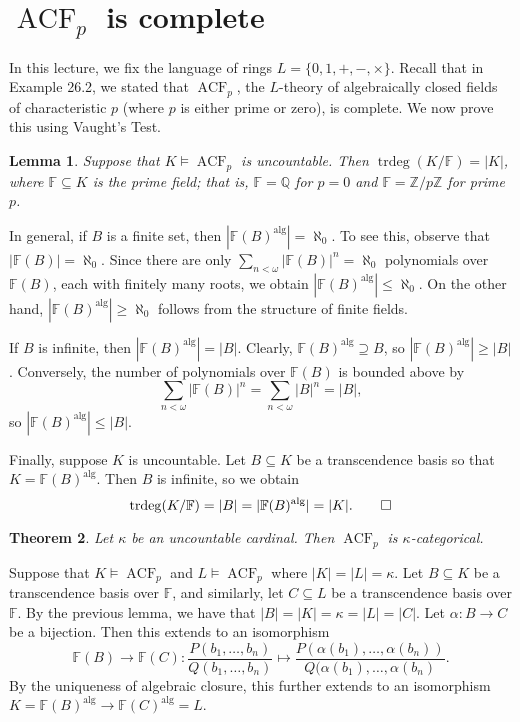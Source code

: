 \documentclass[10pt]{article}
\makeatletter
\newcommand{\Z}{\mathbb{Z}}
\newcommand{\Q}{\mathbb{Q}}
\newcommand{\F}{\mathbb{F}}
\DeclareMathOperator{\ACF}{ACF}
\DeclareMathOperator{\trdeg}{trdeg}
\DeclareMathOperator{\alg}{alg}
\theoremstyle{newstyle}
\newtheorem{thm}{Theorem}[section]
\newtheorem{lemma}[thm]{Lemma}
\newenvironment{pf}[1][\proofname]{\par
  \pushQED{\qed}%
  \normalfont \topsep0\p@\relax
  \trivlist
  \item[\hskip\labelsep\scshape
  #1\@addpunct{.}]\ignorespaces
}{%
  \popQED\endtrivlist\@endpefalse
}
\makeatother
\begin{document}
\newpage
\section{$\ACF_p$ is complete}

In this lecture, we fix the language of rings $L = \{0, 1, +, -, \times\}$. Recall that in Example 26.2, 
we stated that $\ACF_p$, the $L$-theory of algebraically closed fields of characteristic $p$ 
(where $p$ is either prime or zero), is complete. We now prove this using Vaught's Test. 

\begin{lemma}
Suppose that $K \vDash \ACF_p$ is uncountable. Then $\trdeg(K/\F) = |K|$, where $\F \subseteq K$ 
is the prime field; that is, $\F = \Q$ for $p = 0$ and $\F = \Z/p\Z$ for prime $p$. 
\end{lemma}
\begin{pf}
In general, if $B$ is a finite set, then $|\F(B)^{\alg}| = \aleph_0$. To see this, 
observe that $|\F(B)| = \aleph_0$. Since there are only $\sum_{n<\omega} |\F(B)|^n = \aleph_0$ 
polynomials over $\F(B)$, each with finitely many roots, we obtain 
$|\F(B)^{\alg}| \leq \aleph_0$. On the other hand, $|\F(B)^{\alg}| \geq \aleph_0$ follows 
from the structure of finite fields. 

If $B$ is infinite, then $|\F(B)^{\alg}| = |B|$. Clearly, $\F(B)^{\alg} \supseteq B$, so 
$|\F(B)^{\alg}| \geq |B|$. Conversely, the number of polynomials over $\F(B)$ is bounded above by 
\[ \sum_{n<\omega} |\F(B)|^n = \sum_{n<\omega} |B|^n = |B|, \]
so $|\F(B)^{\alg}| \leq |B|$. 

Finally, suppose $K$ is uncountable. Let $B \subseteq K$ be a transcendence basis so that 
$K = \F(B)^{\alg}$. Then $B$ is infinite, so we obtain 
\[ \trdeg(K/\F) = |B| = |\F(B)^{\alg}| = |K|. \qedhere \]
\end{pf}

\begin{thm}
Let $\kappa$ be an uncountable cardinal. Then $\ACF_p$ is $\kappa$-categorical. 
\end{thm}
\begin{pf}
Suppose that $K \vDash \ACF_p$ and $L \vDash \ACF_p$ where $|K| = |L| = \kappa$. 
Let $B \subseteq K$ be a transcendence basis over $\F$, and similarly, let 
$C \subseteq L$ be a transcendence basis over $\F$. By the previous lemma, 
we have that $|B| = |K| = \kappa = |L| = |C|$. Let $\alpha : B \to C$ be a bijection. 
Then this extends to an isomorphism 
\[ \F(B) \to \F(C) : \frac{P(b_1, \dots, b_n)}{Q(b_1, \dots, b_n)} \mapsto 
\frac{P(\alpha(b_1), \dots, \alpha(b_n))}{Q(\alpha(b_1), \dots, \alpha(b_n)}. \]
By the uniqueness of algebraic closure, this further extends to an 
isomorphism $K = \F(B)^{\alg} \to \F(C)^{\alg} = L$. 
\end{pf}
\end{document}
